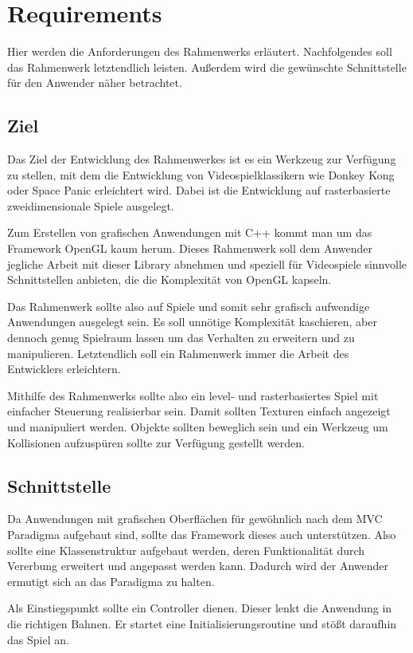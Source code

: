 \section{Requirements}
Hier werden die Anforderungen des Rahmenwerks erläutert. Nachfolgendes soll das Rahmenwerk letztendlich leisten. Außerdem wird die gewünschte Schnittstelle für den Anwender näher betrachtet. 


\subsection{Ziel}
Das Ziel der Entwicklung des Rahmenwerkes ist es ein Werkzeug zur Verfügung zu stellen, mit dem die Entwicklung von Videospielklassikern wie Donkey Kong oder Space Panic erleichtert wird. Dabei ist die Entwicklung auf rasterbasierte zweidimensionale Spiele ausgelegt. 

Zum Erstellen von grafischen Anwendungen mit C++ kommt man um das Framework OpenGL kaum herum. Dieses Rahmenwerk soll dem Anwender jegliche Arbeit mit dieser Library abnehmen und speziell für Videospiele sinnvolle Schnittstellen anbieten, die die Komplexität von OpenGL kapseln. 

Das Rahmenwerk sollte also auf Spiele und somit sehr grafisch aufwendige Anwendungen ausgelegt sein. Es soll unnötige Komplexität kaschieren, aber dennoch genug Spielraum lassen um das Verhalten zu erweitern und zu manipulieren. Letztendlich soll ein Rahmenwerk immer die Arbeit des Entwicklers erleichtern.

Mithilfe des Rahmenwerks sollte also ein level- und rasterbasiertes Spiel mit einfacher Steuerung realisierbar sein. Damit sollten Texturen einfach angezeigt und manipuliert werden. Objekte sollten beweglich sein und ein Werkzeug um Kollisionen aufzuspüren sollte zur Verfügung gestellt werden. 


\subsection{Schnittstelle}
Da Anwendungen mit grafischen Oberflächen für gewöhnlich nach dem MVC Paradigma aufgebaut sind, sollte das Framework dieses auch unterstützen. Also sollte eine Klassenstruktur aufgebaut werden, deren Funktionalität durch Vererbung erweitert und angepasst werden kann. Dadurch wird der Anwender ermutigt sich an das Paradigma zu halten. 

Als Einstiegspunkt sollte ein Controller dienen. Dieser lenkt die Anwendung in die richtigen Bahnen. Er startet eine Initialisierungsroutine und stößt daraufhin das Spiel an.

